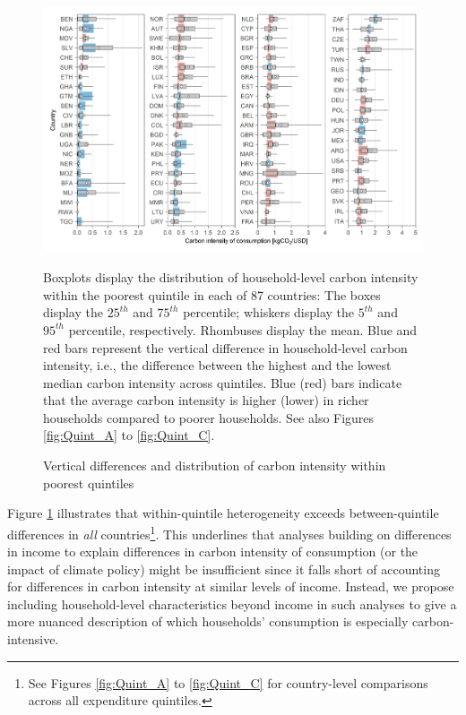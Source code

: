 \documentclass[12pt, a4paper]{article}
\newenvironment{subcaption}
{\strut
\vspace{-5pt}
\begin{minipage}[b]{0.9\textwidth}
  \hspace*{-\parindent}
  \footnotesize}
 {\end{minipage}}
\begin{document}
\begin{figure}[ht!]
    \centering
    \includegraphics{Figure 1/Figure_1_2017}
    \caption{Vertical differences and distribution of carbon intensity within poorest quintiles}
    \label{fig:fig_1}
    \begin{subcaption}
    Boxplots display the distribution of household-level carbon intensity within the poorest quintile in each of 87 countries: The boxes display the $25^{th}$ and $75^{th}$ percentile; whiskers display the $5^{th}$ and $95^{th}$ percentile, respectively. Rhombuses display the mean. Blue and red bars represent the vertical difference in household-level carbon intensity, i.e., the difference between the highest and the lowest median carbon intensity across quintiles. Blue (red) bars indicate that the average carbon intensity is higher (lower) in richer households compared to poorer households. See also Figures \ref{fig:Quint_A} to \ref{fig:Quint_C}.
    \end{subcaption}
\end{figure}

Figure \ref{fig:fig_1} illustrates that within-quintile heterogeneity exceeds between-quintile differences in \textit{all} countries\footnote{See Figures \ref{fig:Quint_A} to \ref{fig:Quint_C} for country-level comparisons across all expenditure quintiles.}. This underlines that analyses building on differences in income to explain differences in carbon intensity of consumption (or the impact of climate policy) might be insufficient since it falls short of accounting for differences in carbon intensity at similar levels of income. Instead, we propose including household-level characteristics beyond income in such analyses to give a more nuanced description of which households' consumption is especially carbon-intensive.
\end{document}
